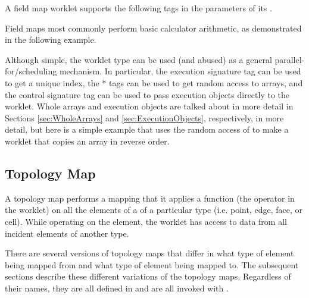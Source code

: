 A field map worklet supports the following tags in the parameters of its
\executionsignature.

\begin{description}
  \numericexecutionsignaturetags

  \commonexecutionsignaturetags
\end{description}

Field maps most commonly perform basic calculator arithmetic, as
demonstrated in the following example.


Although simple, the  worklet type can be
used (and abused) as a general parallel-for/scheduling mechanism. In
particular, the  execution signature tag can be used to
get a unique index, the * tags can be used to get
random access to arrays, and the  control signature tag
can be used to pass execution objects directly to the worklet. Whole arrays
and execution objects are talked about in more detail in Sections
\ref{sec:WholeArrays} and \ref{sec:ExecutionObjects}, respectively, in more
detail, but here is a simple example that uses the random access of
 to make a worklet that copies an array
in reverse order.



\subsection{Topology Map}
\label{sec:TopologyMaps}

A topology map performs a mapping that it applies a function (the
operator in the worklet) on all the elements of a 
of a particular type (i.e. point, edge, face, or cell). While operating on
the element, the worklet has access to data from all incident elements of
another type.

There are several versions of topology maps that differ in what type of
element being mapped from and what type of element being mapped to. The
subsequent sections describe these different variations of the topology
maps. Regardless of their names, they are all defined in
 and are all invoked with
.

